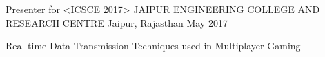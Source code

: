 \begin{cventries}
  \cventry
    {Presenter for <ICSCE 2017>}
    {JAIPUR ENGINEERING COLLEGE AND RESEARCH CENTRE }
    {Jaipur, Rajasthan}
    {May 2017}
    {
      \begin{cvitems}
        \item {Real time Data Transmission Techniques used in Multiplayer Gaming}
      \end{cvitems}
    }
\end{cventries}
